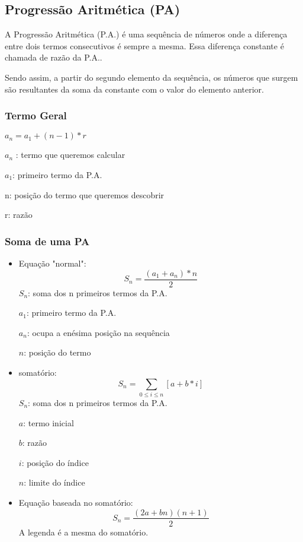 \documentclass[12pt]{article}
\begin{document}
\subsection{Progressão Aritmética (PA)}
A Progressão Aritmética (P.A.) é uma sequência de números onde a diferença entre dois termos consecutivos é sempre a mesma. Essa diferença constante é chamada de razão da P.A..

Sendo assim, a partir do segundo elemento da sequência, os números que surgem são resultantes da soma da constante com o valor do elemento anterior.

\subsubsection{Termo Geral}
$a_n = a_1+(n-1)*r$

$a_n$ : termo que queremos calcular

$a_1$: primeiro termo da P.A.

n: posição do termo que queremos descobrir

r: razão
\subsubsection{Soma de uma PA}
\begin{itemize}
    \item Equação "normal": 
        \begingroup
        \LARGE
        \begin{equation}
            S_n = \frac{(a_1+a_n)*n}{2}
        \end{equation}
        \endgroup
        $S_n$: soma dos n primeiros termos da P.A.

        $a_1$: primeiro termo da P.A.
        
        $a_n$: ocupa a enésima posição na sequência
        
        $n$: posição do termo
    \item somatório: 
        \begingroup
        \LARGE
        \begin{equation}
            S_n = \sum_{0\leq i\leq n}[a+b*i]
        \end{equation}
        \endgroup
        $S_n$: soma dos n primeiros termos da P.A.

        $a$: termo inicial

        $b$: razão

        $i$: posição do índice

        $n$: limite do índice
    \item Equação baseada no somatório:
        \begingroup 
        \LARGE
        \begin{equation}
            S_n = \frac{(2a+bn)(n+1)}{2}
        \end{equation}
        \endgroup
        A legenda é a mesma do somatório.
\end{itemize}
\end{document}
